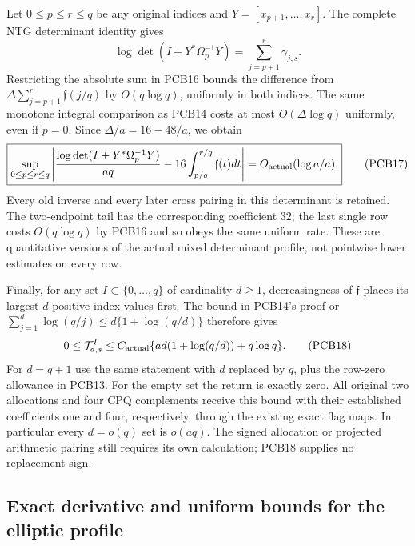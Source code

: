 Let $0\le p\le r\le q$ be any original indices and
$Y=[x_{p+1},\ldots,x_r]$. The complete NTG determinant identity gives
\[
 \log\det(I+Y^*\Omega_p^{-1}Y)
      =\sum_{j=p+1}^{r}\gamma_{j,s}.
\]
Restricting the absolute sum in PCB16 bounds the difference from
$\Delta\sum_{j=p+1}^r\mathfrak f(j/q)$ by $O(q\log q)$,
uniformly in both indices. The same monotone integral comparison as PCB14
costs at most $O(\Delta\log q)$ uniformly, even if $p=0$.
Since $\Delta/a=16-48/a$, we obtain
\[
 \boxed{\sup_{0\le p\le r\le q}
 \left|\frac{\log\det(I+Y^*\Omega_p^{-1}Y)}{aq}
       -16\int_{p/q}^{r/q}\mathfrak f(t)dt\right|
       =O_{\rm actual}(\log a/a).}
 \tag{PCB17}
\]
Every old inverse and every later cross pairing in this determinant is
retained. The two-endpoint tail has the corresponding coefficient $32$;
the last single row costs $O(q\log q)$ by PCB16 and so obeys the same
uniform rate. These are quantitative versions of the actual mixed
determinant profile, not pointwise lower estimates on every row.

Finally, for any set $I\subset\{0,\ldots,q\}$ of cardinality $d\ge1$,
decreasingness of $\mathfrak f$ places its largest $d$ positive-index
values first. The bound in PCB14's proof or
$\sum_{j=1}^d\log(q/j)\le d\{1+\log(q/d)\}$ therefore gives
\[
 0\le\mathcal T^I_{a,s}
    \le C_{\rm actual}\{ad(1+\log(q/d))+q\log q\}.
 \tag{PCB18}
\]
For $d=q+1$ use the same statement with $d$ replaced by $q$, plus the
row-zero allowance in PCB13. For the empty set the return is exactly zero.
All original two allocations and four CPQ complements receive this bound
with their established coefficients one and four, respectively, through
the existing exact flag maps. In particular every $d=o(q)$ set is
$o(aq)$. The signed allocation or projected arithmetic pairing still
requires its own calculation; PCB18 supplies no replacement sign.
\endgroup


\subsection{Exact derivative and uniform bounds for the elliptic profile}

